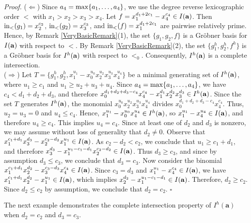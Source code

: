 \documentclass[10pt]{amsart}
\begin{document}
{\em \noindent Proof.}  ($\Leftarrow$) Since $a_{4}={\rm max}\{a_1,\ldots,a_4\}$, we use the degree reverse lexicographic order $<$ with $x_{1}>x_2>x_3>x_4$. Let $f=x_{1}^{d_1+2c_1}-x_{4}^{c_4} \in I({\bf a})$. Then ${\rm in}_{<}(g_1)=x_{2}^{c_2}$, ${\rm in}_{<}(g_2)=x_{3}^{c_3}$, and ${\rm in}_{<}(f)=x_{1}^{d_{1}+2c_1}$ are pairwise relatively prime. Hence, by Remark \ref{VeryBasicRemark}(1), the set $\{g_1, g_2, f\}$ is a Gr\"obner basis for $I({\bf a})$ with respect to $<$. By Remark \ref{VeryBasicRemark}(2), the set $\{g_{1}^{h}, g_{2}^{h}, f^{h}\}$ is a Gr\"obner basis for $I^{h}({\bf a})$ with respect to $<_{0}$. Consequently, $I^{h}({\bf a})$ is a complete intersection.\\
($\Rightarrow$) Let $T=\{g_{1}^{h}, g_{2}^{h}, x_{1}^{u_1}-x_{0}^{u_{0}}x_{2}^{u_2}x_{3}^{u_3}x_{4}^{u_4}\}$ be a minimal generating set of $I^{h}({\bf a})$, where $u_{1} \geq c_{1}$ and $u_{1} \geq u_2+u_3+u_4$. Since $a_{4}={\rm max}\{a_1,\ldots,a_4\}$, we have $c_{4}<d_{1}+d_{2}+d_{3}$, and therefore $x_{0}^{d_{1}+d_{2}+d_{3}-c_{4}}x_{4}^{c_{4}}-x_{1}^{d_{1}}x_{2}^{d_{2}}x_{3}^{d_{3}} \in I^{h}({\bf a})$. Since the set $T$ generates $I^{h}({\bf a})$, the monomial $x_{0}^{u_{0}}x_{2}^{u_2}x_{3}^{u_3}x_{4}^{u_4}$ divides $x_{0}^{d_{1}+d_{2}+d_{3}-c_{4}}x_{4}^{c_{4}}$. Thus, $u_{2}=u_{3}=0$ and $u_{4} \leq c_{4}$. Hence, $x_{1}^{u_1}-x_{0}^{u_{0}}x_{4}^{u_4} \in I^{h}({\bf a})$, so $x_{1}^{u_1}-x_{4}^{u_4} \in I({\bf a})$, and therefore $u_{4} \geq c_{4}$. This implies $u_{4}=c_{4}$. Since at least one of $d_2$ and $d_3$ is nonzero, we may assume without loss of generality that $d_{2} \neq 0$. Observe that $x_{1}^{c_1+d_1}x_{3}^{d_3}-x_{2}^{c_{2}-d_2}x_{1}^{u_1} \in I({\bf a})$. As $c_2-d_2<c_2$, we conclude that $u_{1} \geq c_1+d_{1}$, and therefore $x_{3}^{d_3}-x_{1}^{u_1-c_1-d_1}x_{2}^{c_2-d_2} \in I({\bf a})$. Thus $d_{3} \geq c_3$, and since by assumption $d_3 \leq c_3$, we conclude that $d_{3}=c_3$. Now consider the binomial $x_{1}^{c_1+d_1}x_{2}^{d_2}-x_{3}^{c_3-d_3}x_{4}^{c_4} \in I({\bf a})$. Since $c_3=d_3$ and $x_{1}^{u_1}-x_{4}^{c_4} \in I({\bf a})$, we have $x_{1}^{c_1+d_1}x_{2}^{d_2}-x_{1}^{u_1} \in I({\bf a})$, which implies $x_{2}^{d_2}-x_{1}^{u_1-c_1-d_1} \in I({\bf a})$. Therefore, $d_2 \geq c_2$. Since $d_2 \leq c_2$ by assumption, we conclude that $d_2=c_2$. \hfill $\square$ \par\vspace{0.5\baselineskip}

The next example demonstrates the complete intersection property of $I^h(\mathbf{a})$ when $d_2=c_2$ and $d_3=c_3$.
\end{document}
